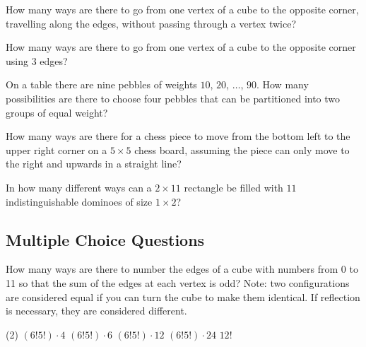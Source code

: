 \documentclass{article}
\begin{document}
\begin{problem}
How many ways are there to go from one vertex of a cube to the opposite corner, travelling along the edges, without passing through a vertex twice?
\end{problem}

\begin{problem}
How many ways are there to go from one vertex of a cube to the opposite corner using 3 edges?
\end{problem}

\begin{problem}
On a table there are nine pebbles of weights $10$, $20$, $\ldots$, $90$. How many possibilities are there to choose four pebbles that can be partitioned into two groups of equal weight?
\end{problem}

\begin{problem}
How many ways are there for a chess piece to move from the bottom left to the upper right corner on a $5\times 5$ chess board, assuming the piece can only move to the right and upwards in a straight line?
\end{problem}

\begin{problem}
In how many different ways can a $2\times 11$ rectangle be filled with $11$ indistinguishable dominoes of size $1\times 2$?
\end{problem}

\subsection{Multiple Choice Questions}

\begin{problem}
How many ways are there to number the edges of a cube with numbers from 0 to 11 so that the sum of the edges at each vertex is odd? 
Note: two configurations are considered equal if you can turn the cube to make them identical. If reflection is necessary, they are considered different. 
\end{problem}
\begin{tasks}(2)
\task $(6!5!)\cdot 4$
\task $(6!5!)\cdot 6$
\task $(6!5!)\cdot 12$
\task $(6!5!)\cdot 24$
\task $12!$
\end{tasks}
\end{document}
